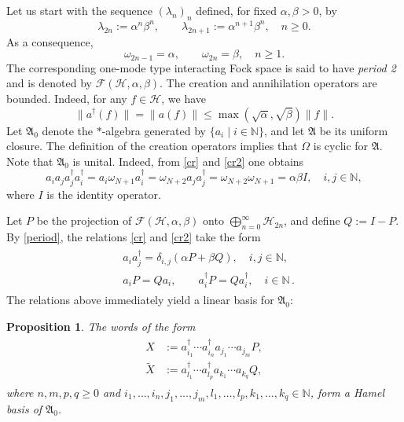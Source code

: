 \documentclass[12pt]{amsart}
\numberwithin{equation}{section}
\def\cf{{\mathcal F}}
\def\ch{{\mathcal H}}
\def\ga{{\mathfrak A}} \def\gpa{{\mathfrak a}}
\def\bn{{\mathbb N}}
\def\a{\alpha}
\def\b{\beta}
\def\d{\delta}  \def\D{\Delta}
\def\l{\lambda} \def\L{\Lambda}
\def\om{\omega} \def\Om{\Omega}
\newtheorem{prop}[thm]{Proposition}
\theoremstyle{definition}
\begin{document}
Let us start with the sequence $(\l_n)_n$ defined, for fixed $\a,\b>0$, by
\begin{equation}\label{lambda}
\l_{2n} := \a^n \b^n, \qquad
\l_{2n+1} := \a^{n+1} \b^n, \quad n\geq 0.
\end{equation}
As a consequence,
\begin{equation}\label{period}
\om_{2n-1} = \a, \qquad \om_{2n} = \b, \quad n \geq 1.
\end{equation}
The corresponding one-mode type interacting Fock space is said to have \emph{period 2} and is denoted by $\cf(\ch,\a,\b)$. The creation and annihilation operators are bounded. Indeed, for any $f\in\ch$, we have
\begin{equation}\label{norm}
\|a^\dag(f)\| = \|a(f)\| \le \max(\sqrt{\a}, \sqrt{\b}) \|f\|.
\end{equation}
Let $\ga_0$ denote the $*$-algebra generated by $\{a_i \mid i \in \bn\}$, and let $\ga$ be its uniform closure. The definition of the creation operators implies that $\Om$ is cyclic for $\ga$.
Note that $\ga_0$ is unital. Indeed, from \eqref{cr} and \eqref{cr2} one obtains
\begin{equation}\label{id}
a_i a_j a_j^\dag a_i^\dag = a_i \om_{N+1} a_i^\dag = \om_{N+2} a_j a_j^\dag = \om_{N+2} \om_{N+1} = \a \b I, \quad i,j \in \bn,
\end{equation}
where $I$ is the identity operator.

Let $P$ be the projection of $\cf(\ch,\a,\b)$ onto $\bigoplus_{n=0}^{\infty} \ch_{2n}$, and define $Q := I-P$. By \eqref{period}, the relations \eqref{cr} and \eqref{cr2} take the form
\begin{align}\label{crperiod}
\begin{split}
&a_i a_j^\dag = \d_{i,j} (\a P + \b Q), \quad i,j\in\bn,\\
&a_i P = Q a_i, \qquad a_i^\dag P = Q a_i^\dag, \quad i \in \bn\,.
\end{split}
\end{align}
The relations above immediately yield a linear basis for $\ga_0$:

\begin{prop}\label{basis}
The words of the form
\begin{align}\label{hambas}
\begin{split}
X &:= a^\dag_{i_1} \cdots a^\dag_{i_n} a_{j_1} \cdots a_{j_m} P,\\
\widetilde{X} &:= a^\dag_{l_1} \cdots a^\dag_{l_p} a_{k_1} \cdots a_{k_q} Q,
\end{split}
\end{align}
where $n,m,p,q \geq 0$ and
$i_1,\dots,i_n,j_1,\dots,j_m,l_1,\dots,l_p,k_1,\dots,k_q \in \bn$, form a Hamel basis of $\ga_0$.
\end{prop}
\end{document}
